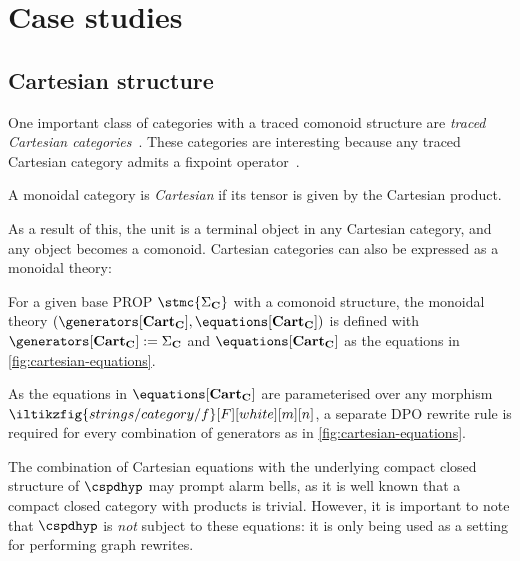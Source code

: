 \section{Case studies}

\subsection{Cartesian structure}

One important class of categories with a traced comonoid structure are
\emph{traced Cartesian categories}~\cite{cazanescu1990new,hasegawa1997recursion}.
These categories are interesting because any traced Cartesian
category admits a fixpoint operator~\cite[Thm. 3.1]{hasegawa1997recursion}.

\begin{definition}
    A monoidal category is \emph{Cartesian} if its tensor is given by the
    Cartesian product.
\end{definition}

As a result of this, the unit is a terminal object in any Cartesian category,
and any object becomes a comonoid.
Cartesian categories can also be expressed as a monoidal theory:

\begin{definition}
    For a given base PROP \(\stmc{\Sigma_\mathbf{C}}\) with a comonoid
    structure, the monoidal theory \((
        \generators[\mathbf{Cart}_\mathbf{C}],
        \equations[\mathbf{Cart}_\mathbf{C}]
    )\) is defined with \(
        \generators[\mathbf{Cart}_\mathbf{C}] := \Sigma_\mathbf{C}
    \) and \(
        \equations[\mathbf{Cart}_\mathbf{C}]
    \) as the equations in \cref{fig:cartesian-equations}.
\end{definition}

As the equations in \(\equations[\mathbf{Cart}_\mathbf{C}]\) are parameterised
over any morphism \(\iltikzfig{strings/category/f}[F][white][m][n]\), a separate
DPO rewrite rule is required for every combination of generators as in
\cref{fig:cartesian-equations}.

\begin{remark}
    The combination of Cartesian equations with the underlying compact closed
    structure of \(\cspdhyp\) may prompt alarm bells, as it is well known that
    a compact closed category with products is trivial.
    However, it is important to note that \(\cspdhyp\) is \emph{not} subject to
    these equations: it is only being used as a setting for performing graph
    rewrites.
\end{remark}

